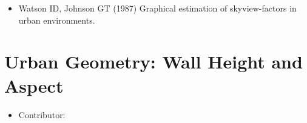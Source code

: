 \documentclass[letterpaper,10pt,english]{sphinxmanual}
\begin{document}
\begin{itemize}
\begin{description}
\begin{itemize}
\item {} 
Watson ID, Johnson GT (1987) Graphical estimation of skyview-factors in urban environments. 

\end{itemize}

\end{description}

\end{itemize}


\section{Urban Geometry: Wall Height and Aspect}
\label{\detokenize{pre-processor/Urban Geometry Wall Height and Aspect:urban-geometry-wall-height-and-aspect}}\label{\detokenize{pre-processor/Urban Geometry Wall Height and Aspect:wallheightandaspect}}\label{\detokenize{pre-processor/Urban Geometry Wall Height and Aspect::doc}}\begin{itemize}
\item {} 
Contributor:

\end{itemize}
\end{document}
